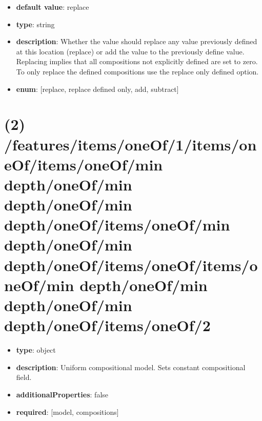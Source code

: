 \begin{itemize}[leftmargin=3em]\item {\bf default value}: replace
\item {\bf type}: string
\item {\bf description}: Whether the value should replace any value previously defined at this location (replace) or add the value to the previously define value. Replacing implies that all compositions not explicitly defined are set to zero. To only replace the defined compositions use the replace only defined option.
\item {\bf enum}: [replace, replace defined only, add, subtract]\end{itemize}\section{(2) /features/items/oneOf/1/items/oneOf/items/oneOf/min depth/oneOf/min depth/oneOf/min depth/oneOf/items/oneOf/min depth/oneOf/min depth/oneOf/items/oneOf/items/oneOf/min depth/oneOf/min depth/oneOf/min depth/oneOf/items/oneOf/2}
\begin{itemize}[leftmargin=2em]\item {\bf type}: object
\item {\bf description}: Uniform compositional model. Sets constant compositional field.
\item {\bf additionalProperties}: false
\item {\bf required}: [model, compositions]\end{itemize}
